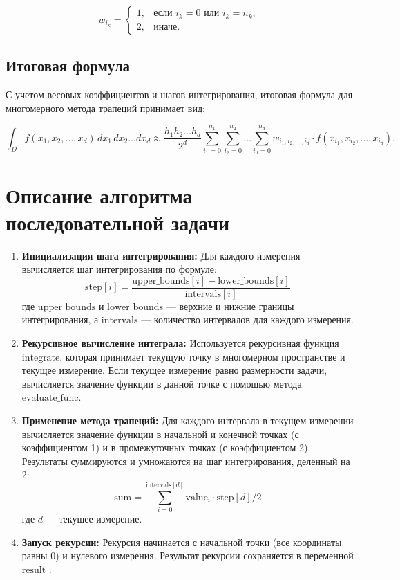 \documentclass{article}
\begin{document}
\[
w_{i_k} = 
\begin{cases}
1, & \text{если } i_k = 0 \text{ или } i_k = n_k, \\
2, & \text{иначе}.
\end{cases}
\]

\subsection*{Итоговая формула}
С учетом весовых коэффициентов и шагов интегрирования, итоговая формула для многомерного метода трапеций принимает вид:

\[
\int_D f(x_1, x_2, \dots, x_d) \, dx_1 \, dx_2 \dots dx_d \approx \frac{h_1 h_2 \dots h_d}{2^d} \sum_{i_1=0}^{n_1} \sum_{i_2=0}^{n_2} \dots \sum_{i_d=0}^{n_d} w_{i_1, i_2, \dots, i_d} \cdot f(x_{i_1}, x_{i_2}, \dots, x_{i_d}).
\]
   \vspace{1.0cm}

\section{Описание алгоритма последовательной задачи}
\begin{enumerate}
    \item \textbf{Инициализация шага интегрирования:} 
    Для каждого измерения вычисляется шаг интегрирования по формуле:
    \[
    \text{step}[i] = \frac{\text{upper\_bounds}[i] - \text{lower\_bounds}[i]}{\text{intervals}[i]}
    \]
    где \(\text{upper\_bounds}\) и \(\text{lower\_bounds}\) — верхние и нижние границы интегрирования, а \(\text{intervals}\) — количество интервалов для каждого измерения.

    \item \textbf{Рекурсивное вычисление интеграла:} 
    Используется рекурсивная функция \(\text{integrate}\), которая принимает текущую точку в многомерном пространстве и текущее измерение. Если текущее измерение равно размерности задачи, вычисляется значение функции в данной точке с помощью метода \(\text{evaluate\_func}\).

    \item \textbf{Применение метода трапеций:} 
    Для каждого интервала в текущем измерении вычисляется значение функции в начальной и конечной точках (с коэффициентом 1) и в промежуточных точках (с коэффициентом 2). Результаты суммируются и умножаются на шаг интегрирования, деленный на 2:
    \[
    \text{sum} = \sum_{i=0}^{\text{intervals}[d]} \text{value}_i \cdot \text{step}[d] / 2
    \]
    где \(d\) — текущее измерение.

    \item \textbf{Запуск рекурсии:} 
    Рекурсия начинается с начальной точки (все координаты равны 0) и нулевого измерения. Результат рекурсии сохраняется в переменной \(\text{result\_}\).
\end{enumerate}
\end{document}
